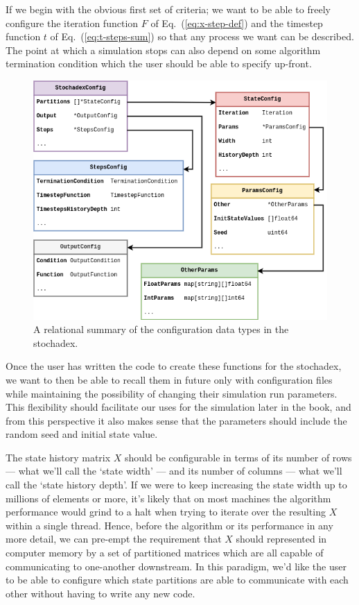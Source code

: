 If we begin with the obvious first set of criteria; we want to be able to freely configure the iteration function $F$ of Eq.~(\ref{eq:x-step-def}) and the timestep function $t$ of Eq.~(\ref{eq:t-steps-sum}) so that any process we want can be described. The point at which a simulation stops can also depend on some algorithm termination condition which the user should be able to specify up-front.

\begin{figure}[h]
\centering
\includegraphics[width=13cm]{images/chapter-1-stochadex-data-types.drawio.png}
\caption{A relational summary of the configuration data types in the stochadex.}
\label{fig:data-types-design}
\end{figure}

Once the user has written the code to create these functions for the stochadex, we want to then be able to recall them in future only with configuration files while maintaining the possibility of changing their simulation run parameters. This flexibility should facilitate our uses for the simulation later in the book, and from this perspective it also makes sense that the parameters should include the random seed and initial state value.

The state history matrix $X$ should be configurable in terms of its number of rows --- what we'll call the `state width' --- and its number of columns --- what we'll call the `state history depth'. If we were to keep increasing the state width up to millions of elements or more, it's likely that on most machines the algorithm performance would grind to a halt when trying to iterate over the resulting $X$ within a single thread. Hence, before the algorithm or its performance in any more detail, we can pre-empt the requirement that $X$ should represented in computer memory by a set of partitioned matrices which are all capable of communicating to one-another downstream. In this paradigm, we'd like the user to be able to configure which state partitions are able to communicate with each other without having to write any new code.

